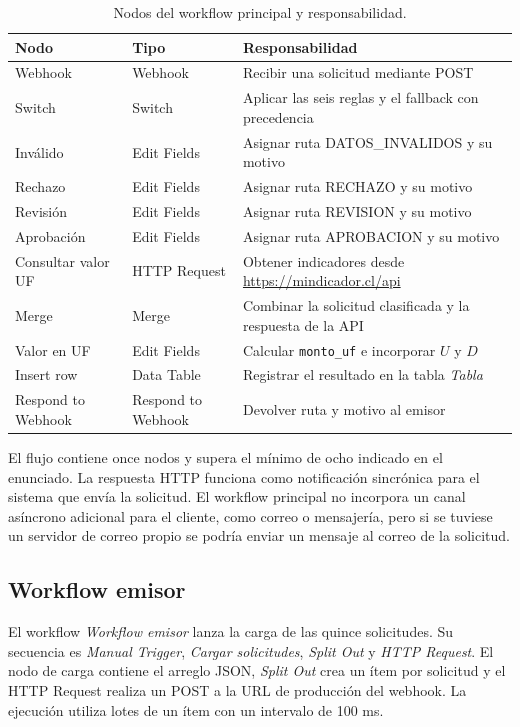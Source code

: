 \documentclass[11pt,letterpaper]{article}
\begin{document}
\begin{table}[H]
\centering
\caption{Nodos del workflow principal y responsabilidad.}
\small
\begin{tabularx}{\textwidth}{l l >{\RaggedRight\arraybackslash}X}
\toprule
\textbf{Nodo} & \textbf{Tipo} & \textbf{Responsabilidad} \\
\midrule
Webhook & Webhook & Recibir una solicitud mediante POST \\
Switch & Switch & Aplicar las seis reglas y el fallback con precedencia \\
Inválido & Edit Fields & Asignar ruta DATOS\_INVALIDOS y su motivo \\
Rechazo & Edit Fields & Asignar ruta RECHAZO y su motivo \\
Revisión & Edit Fields & Asignar ruta REVISION y su motivo \\
Aprobación & Edit Fields & Asignar ruta APROBACION y su motivo \\
Consultar valor UF & HTTP Request & Obtener indicadores desde \url{https://mindicador.cl/api} \\
Merge & Merge & Combinar la solicitud clasificada y la respuesta de la API \\
Valor en UF & Edit Fields & Calcular \texttt{monto\_uf} e incorporar $U$ y $D$ \\
Insert row & Data Table & Registrar el resultado en la tabla \textit{Tabla} \\
Respond to Webhook & Respond to Webhook & Devolver ruta y motivo al emisor \\
\bottomrule
\end{tabularx}
\end{table}

El flujo contiene once nodos y supera el mínimo de ocho indicado en el enunciado. La respuesta HTTP funciona como notificación sincrónica para el sistema que envía la solicitud. El workflow principal no incorpora un canal asíncrono adicional para el cliente, como correo o mensajería, pero si se tuviese un servidor de correo propio se podría enviar un mensaje al correo de la solicitud.

\subsection{Workflow emisor}
El workflow \textit{Workflow emisor} lanza la carga de las quince solicitudes. Su secuencia es \textit{Manual Trigger}, \textit{Cargar solicitudes}, \textit{Split Out} y \textit{HTTP Request}. El nodo de carga contiene el arreglo JSON, \textit{Split Out} crea un ítem por solicitud y el HTTP Request realiza un POST a la URL de producción del webhook. La ejecución utiliza lotes de un ítem con un intervalo de 100 ms.
\end{document}
